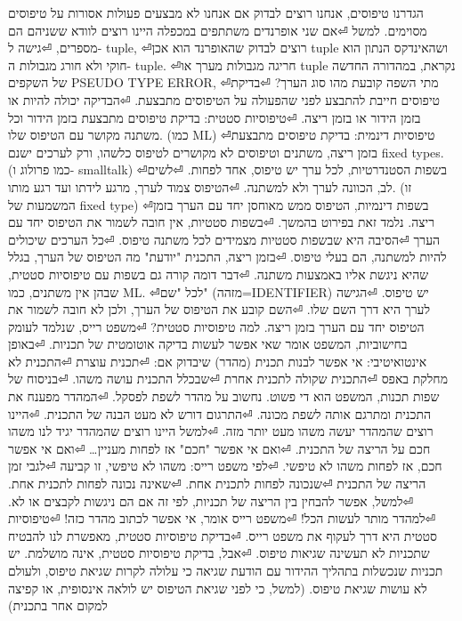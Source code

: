       \begin{ציינון}
\item הגדרנו טיפוסים, אנחנו רוצים לבדוק אם אנחנו לא מבצעים פעולות אסורות על טיפוסים מסוימים. למשל
⏎אם שני אופרנדים משתתפים במכפלה היינו רוצים לוודא ששניהם הם מספרים,
⏎גישה ל- tuple,
⏎רוצים לבדוק שהאופרנד הוא אכן tuple ושהאינדקס הנתון הוא חוקי ולא חורג מגבולות ה- tuple.
⏎חריגה מגבולות מערך או tuple נקראת, במהדורה החדשה של השקפים PSEUDO TYPE ERROR,
⏎מתי השפה קובעת מהו סוג הערך?
⏎בדיקת טיפוסים חייבת להתבצע לפני שהפעולה על הטיפוסים מתבצעת.
⏎הבדיקה יכולה להיות או בזמן הידור או בזמן ריצה.
⏎טיפוסיות סטטית: בדיקת טיפוסים מתבצעת בזמן הידור וכל משתנה מקושר עם הטיפוס שלו. (כמו ML)
⏎טיפוסיות דינמית: בדיקת טיפוסים מתבצעת בזמן ריצה, משתנים וטיפוסים לא מקושרים לטיפוס כלשהו, ורק לערכים ישנם fixed types. (כמו פרולוג ו- smalltalk)
⏎בשפות הסטנדרטיות, לכל ערך יש טיפוס, אחד לפחות.
⏎לשים לב, הכוונה לערך ולא למשתנה.
⏎הטיפוס צמוד לערך, מרגע לידתו ועד רגע מותו. (זו המשמעות של fixed type)
⏎בשפות דינמיות, הטיפוס ממש מאוחסן יחד עם הערך בזמן ריצה. נלמד זאת בפירוט בהמשך.
⏎בשפות סטטיות, אין חובה לשמור את הטיפוס יחד עם הערך
⏎הסיבה היא שבשפות סטטיות מצמידים לכל משתנה טיפוס.
⏎כל הערכים שיכולים להיות למשתנה, הם בעלי טיפוס.
⏎בזמן ריצה, התכנית "יודעת" מה הטיפוס של הערך, בגלל שהיא ניגשת אליו באמצעות משתנה.
⏎דבר דומה קורה גם בשפות עם טיפוסיות סטטית, שבהן אין משתנים, כמו ML.
⏎לכל "שם" (מזהה=IDENTIFIER) יש טיפוס.
⏎הגישה לערך היא דרך השם שלו.
⏎השם קובע את הטיפוס של הערך, ולכן לא חובה לשמור את הטיפוס יחד עם הערך בזמן ריצה.
      למה טיפוסיות סטטית?
⏎משפט רייס, שנלמד לעומק בחישוביות, המשפט אומר שאי אפשר לעשות בדיקה אוטומטית של תכניות.
⏎באופן אינטואיטיבי: אי אפשר לבנות תכנית (מהדר) שיבדוק אם:
⏎תכנית עוצרת
⏎התכנית לא מחלקת באפס
⏎התכנית שקולה לתכנית אחרת
⏎שבכלל התכנית עושה משהו.
⏎בניסוח של שפות תכנות, המשפט הוא די פשוט. נחשוב על מהדר לשפת לפסקל.
⏎המהדר מפענח את התכנית ומתרגם אותה לשפת מכונה.
⏎התרגום דורש לא מעט הבנה של התכנית.
⏎היינו רוצים שהמהדר יעשה משהו מעט יותר מזה.
⏎למשל היינו רוצים שהמהדר יגיד לנו משהו חכם על הריצה של התכנית.
⏎ואם אי אפשר "חכם" אז לפחות מעניין…
⏎ואם אי אפשר חכם, אז לפחות משהו לא טיפשי.
⏎לפי משפט רייס: משהו לא טיפשי, זו קביעה
⏎לגבי זמן הריצה של התכנית
⏎שנכונה לפחות לתכנית אחת.
⏎שאינה נכונה לפחות לתכנית אחת.
⏎למשל, אפשר להבחין בין הריצה של תכניות, לפי זה אם הם ניגשות לקבצים או לא.
⏎למהדר מותר לעשות הכל!
⏎משפט רייס אומר, אי אפשר לכתוב מהדר כזה!
⏎טיפוסיות סטטית היא דרך לעקוף את משפט רייס.
⏎בדיקת טיפוסיות סטטית, מאפשרת לנו להבטיח שתכניות לא תעשינה שגיאות טיפוס.
⏎אבל, בדיקת טיפוסיות סטטית, אינה מושלמת. יש תכניות שנכשלות בתהליך ההידור עם הודעת שגיאה כי עלולה לקרות שגיאת טיפוס, ולעולם לא עושות שגיאת טיפוס. (למשל, כי לפני שגיאת הטיפוס יש לולאה אינסופית, או קפיצה למקום אחר בתכנית)
    \end{ציינון}

